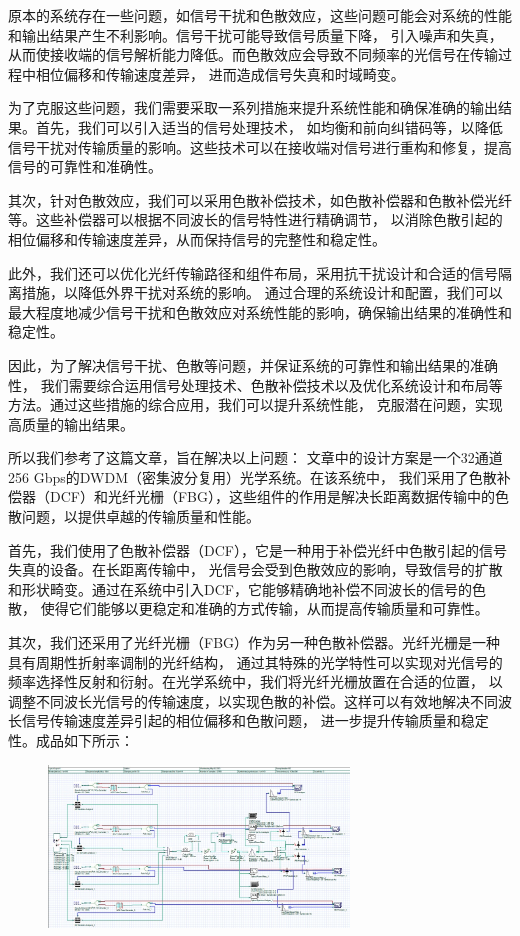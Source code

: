 \documentclass[12pt]{article}
\begin{document}
原本的系统存在一些问题，如信号干扰和色散效应，这些问题可能会对系统的性能和输出结果产生不利影响。信号干扰可能导致信号质量下降，
引入噪声和失真，从而使接收端的信号解析能力降低。而色散效应会导致不同频率的光信号在传输过程中相位偏移和传输速度差异，
进而造成信号失真和时域畸变。

为了克服这些问题，我们需要采取一系列措施来提升系统性能和确保准确的输出结果。首先，我们可以引入适当的信号处理技术，
如均衡和前向纠错码等，以降低信号干扰对传输质量的影响。这些技术可以在接收端对信号进行重构和修复，提高信号的可靠性和准确性。

其次，针对色散效应，我们可以采用色散补偿技术，如色散补偿器和色散补偿光纤等。这些补偿器可以根据不同波长的信号特性进行精确调节，
以消除色散引起的相位偏移和传输速度差异，从而保持信号的完整性和稳定性。

此外，我们还可以优化光纤传输路径和组件布局，采用抗干扰设计和合适的信号隔离措施，以降低外界干扰对系统的影响。
通过合理的系统设计和配置，我们可以最大程度地减少信号干扰和色散效应对系统性能的影响，确保输出结果的准确性和稳定性。

因此，为了解决信号干扰、色散等问题，并保证系统的可靠性和输出结果的准确性，
我们需要综合运用信号处理技术、色散补偿技术以及优化系统设计和布局等方法。通过这些措施的综合应用，我们可以提升系统性能，
克服潜在问题，实现高质量的输出结果。

所以我们参考了这篇文章\cite{BHATTACHARJEE2022168598}，旨在解决以上问题：
文章中的设计方案是一个32通道256 Gbps的DWDM（密集波分复用）光学系统。在该系统中，
我们采用了色散补偿器（DCF）和光纤光栅（FBG），这些组件的作用是解决长距离数据传输中的色散问题，以提供卓越的传输质量和性能。

首先，我们使用了色散补偿器（DCF），它是一种用于补偿光纤中色散引起的信号失真的设备。在长距离传输中，
光信号会受到色散效应的影响，导致信号的扩散和形状畸变。通过在系统中引入DCF，它能够精确地补偿不同波长的信号的色散，
使得它们能够以更稳定和准确的方式传输，从而提高传输质量和可靠性。

其次，我们还采用了光纤光栅（FBG）作为另一种色散补偿器。光纤光栅是一种具有周期性折射率调制的光纤结构，
通过其特殊的光学特性可以实现对光信号的频率选择性反射和衍射。在光学系统中，我们将光纤光栅放置在合适的位置，
以调整不同波长光信号的传输速度，以实现色散的补偿。这样可以有效地解决不同波长信号传输速度差异引起的相位偏移和色散问题，
进一步提升传输质量和稳定性。成品如下所示：

\begin{figure}[htbp]
	\centering
	\includegraphics[width=8cm]{figure6.png}
\end{figure}
\end{document}
